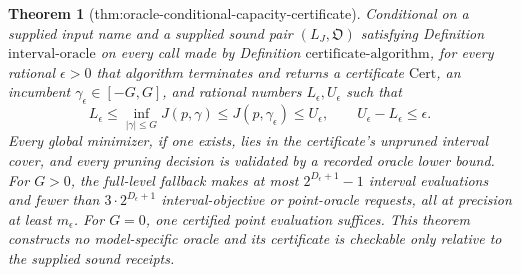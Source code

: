 \documentclass{article}
\newtheorem{theorem}{Theorem}
\begin{document}
\begin{theorem}[thm:oracle-conditional-capacity-certificate]\label{thm:oracle-conditional-capacity-certificate}
Conditional on a supplied input name and a supplied sound pair \((L_J,\mathfrak O)\) satisfying Definition \(\mathrm{interval\mbox{-}oracle}\) on every call made by Definition \(\mathrm{certificate\mbox{-}algorithm}\), for every rational \(\epsilon>0\) that algorithm terminates and returns a certificate \(\mathrm{Cert}\), an incumbent \(\gamma_\epsilon\in[-G,G]\), and rational numbers \(L_\epsilon,U_\epsilon\) such that
\[
 L_\epsilon\leq \inf_{|\gamma|\leq G}J(p,\gamma)
 \leq J(p,\gamma_\epsilon)\leq U_\epsilon,
 \qquad U_\epsilon-L_\epsilon\leq\epsilon.
\]
Every global minimizer, if one exists, lies in the certificate's unpruned interval cover, and every pruning decision is validated by a recorded oracle lower bound.  For \(G>0\), the full-level fallback makes at most \(2^{D_\epsilon+1}-1\) interval evaluations and fewer than \(3\cdot2^{D_\epsilon+1}\) interval-objective or point-oracle requests, all at precision at least \(m_\epsilon\).  For \(G=0\), one certified point evaluation suffices.  This theorem constructs no model-specific oracle and its certificate is checkable only relative to the supplied sound receipts.
\end{theorem}
\end{document}
